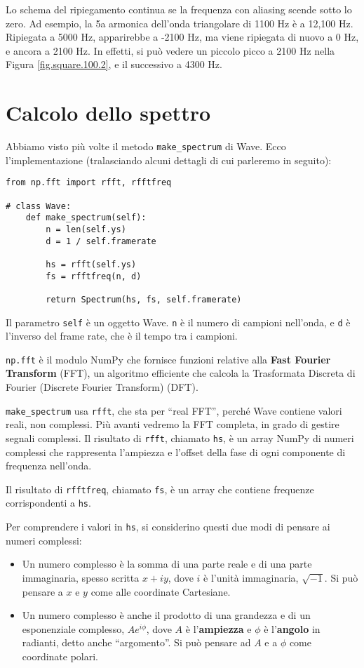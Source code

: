 \documentclass[12pt,a4paper]{book}
\begin{document}
Lo schema del ripiegamento continua se la frequenza con aliasing scende sotto lo zero. Ad esempio, la 5a armonica dell'onda triangolare di 1100 Hz è a 12,100 Hz. Ripiegata a 5000 Hz, apparirebbe a -2100 Hz, ma viene ripiegata di nuovo a 0 Hz, e ancora a 2100 Hz. In effetti, si può vedere un piccolo picco a 2100 Hz nella Figura \ref{fig.square.100.2}, e il successivo a 4300 Hz.

\section{Calcolo dello spettro} 

Abbiamo visto più volte il metodo \verb"make_spectrum" di Wave. Ecco l'implementazione (tralasciando alcuni dettagli di cui parleremo in seguito):

\begin{verbatim} 
from np.fft import rfft, rfftfreq

# class Wave:
    def make_spectrum(self):
        n = len(self.ys)
        d = 1 / self.framerate

        hs = rfft(self.ys)
        fs = rfftfreq(n, d)

        return Spectrum(hs, fs, self.framerate)
 \end{verbatim} 

Il parametro {\tt self} è un oggetto Wave. {\tt n} è il numero di campioni nell'onda, e {\tt d} è l'inverso del frame rate, che è il tempo tra i campioni.

{\tt np.fft} è il modulo NumPy che fornisce funzioni relative alla {\bf Fast Fourier Transform} (FFT), un algoritmo efficiente che calcola la Trasformata Discreta di Fourier (Discrete Fourier Transform) (DFT).

\verb"make_spectrum" usa {\tt rfft}, che sta per ``real FFT'', perché Wave contiene valori reali, non complessi. Più avanti vedremo la FFT completa, in grado di gestire segnali complessi. Il risultato di {\tt rfft}, chiamato {\tt hs}, è un array NumPy di numeri complessi che rappresenta l'ampiezza e l'offset della fase di ogni componente di frequenza nell'onda.

Il risultato di {\tt rfftfreq}, chiamato {\tt fs}, è un array che contiene frequenze corrispondenti a {\tt hs}.

Per comprendere i valori in {\tt hs}, si considerino questi due modi di pensare ai numeri complessi:

\begin{itemize} 

\item Un numero complesso è la somma di una parte reale e di una parte immaginaria, spesso scritta $x + iy$, dove $i$ è l'unità immaginaria, $\sqrt{-1}$. Si può pensare a $x$ e $y$ come alle coordinate Cartesiane.

\item Un numero complesso è anche il prodotto di una grandezza e di un esponenziale complesso, $A e^{i \phi}$, dove $A$ è l'{\bf ampiezza} e $\phi$ è l'{\bf angolo} in radianti, detto anche ``argomento''. Si può pensare ad $A$ e a $\phi$ come coordinate polari.

\end{itemize} 
\end{document}
